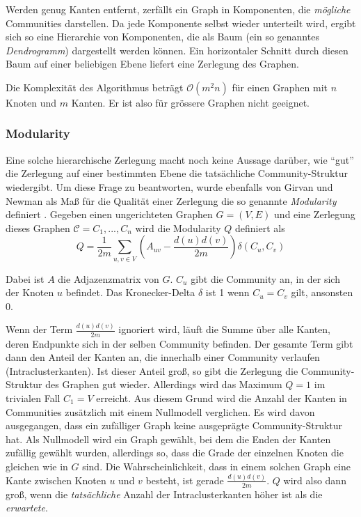 Werden genug Kanten entfernt, zerfällt ein Graph in Komponenten, die
\emph{mögliche} Communities darstellen. Da jede Komponente selbst
wieder unterteilt wird, ergibt sich so eine Hierarchie von
Komponenten, die als Baum (ein so genanntes \emph{Dendrogramm})
dargestellt werden können. Ein horizontaler Schnitt durch diesen
Baum auf einer beliebigen Ebene liefert eine Zerlegung des Graphen.

Die Komplexität des Algorithmus beträgt $\mathcal{O}(m^2n)$ für
einen Graphen mit $n$ Knoten und $m$ Kanten. Er ist also für
grössere Graphen nicht geeignet.

\subsubsection{Modularity}
\label{sec:modularity}

Eine solche hierarchische Zerlegung macht noch keine Aussage
darüber, wie ``gut'' die Zerlegung auf einer bestimmten Ebene die
tatsächliche Community-Struktur wiedergibt. Um diese Frage zu
beantworten, wurde ebenfalls von Girvan und Newman als Ma{\ss} für die
Qualität einer Zerlegung die so genannte \emph{Modularity}
definiert \cite{Newman2004}. Gegeben einen ungerichteten Graphen $G=(V,
E)$ und eine Zerlegung dieses Graphen $\mathcal{C} = C_1, ..., C_n$
wird die Modularity $Q$ definiert als
\begin{equation}
  \label{eq:modularity}
  Q =
  \frac{1}{2m}\sum_{u, v \in
    V}\left(A_{uv}-\frac{d(u)d(v)}{2m}\right)\delta\left(C_u, C_v\right)
\end{equation}

Dabei ist $A$ die Adjazenzmatrix von $G$. $C_u$ gibt die Community an,
in der sich der Knoten $u$ befindet. Das Kronecker-Delta $\delta$
ist 1 wenn $C_u = C_v$ gilt, ansonsten 0.

Wenn der Term $\frac{d(u)d(v)}{2m}$ ignoriert wird, läuft die Summe
über alle Kanten, deren Endpunkte sich in der selben Community
befinden. Der gesamte Term gibt dann den Anteil der Kanten an, die
innerhalb einer Community verlaufen (Intraclusterkanten). Ist dieser Anteil groß, so gibt
die Zerlegung die Community-Struktur des Graphen gut
wieder. Allerdings wird das Maximum $Q = 1$ im trivialen Fall $C_1 =
V$ erreicht. Aus diesem Grund wird die Anzahl der Kanten in
Communities zusätzlich mit einem Nullmodell verglichen. Es wird
davon ausgegangen, dass ein zufälliger Graph keine ausgeprägte
Community-Struktur hat. Als Nullmodell wird ein Graph gewählt, bei
dem die Enden der Kanten zufällig gewählt wurden, allerdings so,
dass die Grade der einzelnen Knoten die gleichen wie in $G$ sind.  Die
Wahrscheinlichkeit, dass in einem solchen Graph eine Kante zwischen
Knoten $u$ und $v$ besteht, ist gerade $\frac{d(u)d(v)}{2m}$. $Q$ wird
also dann groß, wenn die \emph{tatsächliche} Anzahl der
Intraclusterkanten höher ist als die \emph{erwartete}.

